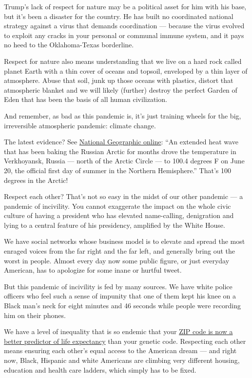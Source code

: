 Trump's lack of respect for nature may be a political asset for him with
his base, but it's been a disaster for the country. He has built no
coordinated national strategy against a virus that demands coordination
--- because the virus evolved to exploit any cracks in your personal or
communal immune system, and it pays no heed to the Oklahoma-Texas
borderline.

Respect for nature also means understanding that we live on a hard rock
called planet Earth with a thin cover of oceans and topsoil, enveloped
by a thin layer of atmosphere. Abuse that soil, junk up those oceans
with plastics, distort that atmospheric blanket and we will likely
(further) destroy the perfect Garden of Eden that has been the basis of
all human civilization.

And remember, as bad as this pandemic is, it's just training wheels for
the big, irreversible atmospheric pandemic: climate change.

The latest evidence? See
\href{https://www.nationalgeographic.com/science/2020/06/what-100-degree-day-siberia-means-climate-change/}{National
Geographic online}: ``An extended heat wave that has been baking the
Russian Arctic for months drove the temperature in Verkhoyansk, Russia
--- north of the Arctic Circle --- to 100.4 degrees F on June 20, the
official first day of summer in the Northern Hemisphere.'' That's 100
degrees in the Arctic!

Respect each other? That's not so easy in the midst of our other
pandemic --- a pandemic of incivility. You cannot exaggerate the impact
on the whole civic culture of having a president who has elevated
name-calling, denigration and lying to a central feature of his
presidency, amplified by the White House.

We have social networks whose business model is to elevate and spread
the most enraged voices from the far right and the far left, and
generally bring out the worst in people. Almost every day now some
public figure, or just everyday American, has to apologize for some
inane or hurtful tweet.

But this pandemic of incivility is fed by many sources. We have white
police officers who feel such a sense of impunity that one of them kept
his knee on a Black man's neck for eight minutes and 46 seconds while
people were recording him on their phones.

We have a level of inequality that is so endemic that your
\href{https://www.nytimes3xbfgragh.onion/interactive/2020/05/13/opinion/inequality-cities-life-expectancy.html}{ZIP
code is now a better predictor of life expectancy} than your genetic
code. Respecting each other means ensuring each other's equal access to
the American dream --- and right now, Black, Hispanic and white
Americans are climbing very different housing, education and health care
ladders, which simply has to be fixed.

